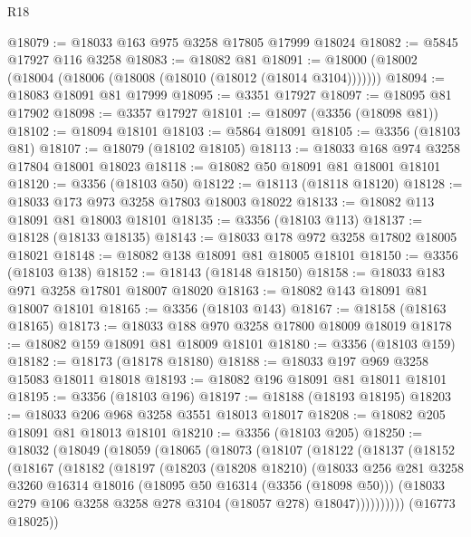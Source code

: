 \begin{lexlean}{R18}
\begin{coremodule}
@18079 := @18033 @163 @975 @3258 @17805 @17999 @18024
@18082 := @5845 @17927 @116 @3258
@18083 := @18082 @81
@18091 := @18000 (@18002 (@18004 (@18006 (@18008 (@18010 (@18012 (@18014 @3104)))))))
@18094 := @18083 @18091 @81 @17999
@18095 := @3351 @17927
@18097 := @18095 @81 @17902
@18098 := @3357 @17927
@18101 := @18097 (@3356 (@18098 @81))
@18102 := @18094 @18101
@18103 := @5864 @18091
@18105 := @3356 (@18103 @81)
@18107 := @18079 (@18102 @18105)
@18113 := @18033 @168 @974 @3258 @17804 @18001 @18023
@18118 := @18082 @50 @18091 @81 @18001 @18101
@18120 := @3356 (@18103 @50)
@18122 := @18113 (@18118 @18120)
@18128 := @18033 @173 @973 @3258 @17803 @18003 @18022
@18133 := @18082 @113 @18091 @81 @18003 @18101
@18135 := @3356 (@18103 @113)
@18137 := @18128 (@18133 @18135)
@18143 := @18033 @178 @972 @3258 @17802 @18005 @18021
@18148 := @18082 @138 @18091 @81 @18005 @18101
@18150 := @3356 (@18103 @138)
@18152 := @18143 (@18148 @18150)
@18158 := @18033 @183 @971 @3258 @17801 @18007 @18020
@18163 := @18082 @143 @18091 @81 @18007 @18101
@18165 := @3356 (@18103 @143)
@18167 := @18158 (@18163 @18165)
@18173 := @18033 @188 @970 @3258 @17800 @18009 @18019
@18178 := @18082 @159 @18091 @81 @18009 @18101
@18180 := @3356 (@18103 @159)
@18182 := @18173 (@18178 @18180)
@18188 := @18033 @197 @969 @3258 @15083 @18011 @18018
@18193 := @18082 @196 @18091 @81 @18011 @18101
@18195 := @3356 (@18103 @196)
@18197 := @18188 (@18193 @18195)
@18203 := @18033 @206 @968 @3258 @3551 @18013 @18017
@18208 := @18082 @205 @18091 @81 @18013 @18101
@18210 := @3356 (@18103 @205)
@18250 := @18032
    (@18049
      (@18059
        (@18065
          (@18073
            (@18107
              (@18122
                (@18137
                  (@18152
                    (@18167
                      (@18182
                        (@18197
                          (@18203
                            (@18208 @18210)
                            (@18033
                              @256
                              @281
                              @3258
                              @3260
                              @16314
                              @18016
                              (@18095 @50 @16314 (@3356 (@18098 @50)))
                              (@18033
                                @279
                                @106
                                @3258
                                @3258
                                @278
                                @3104
                                (@18057 @278)
                                @18047))))))))))
            (@16773 @18025))

\end{coremodule}
\end{lexlean}
